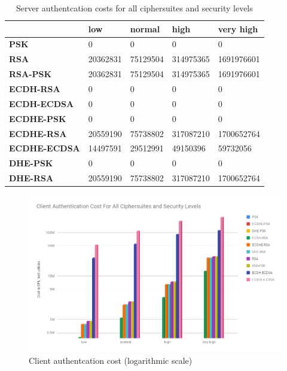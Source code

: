 \documentclass{llncs}
\begin{document}
\begin{table}[]
\begin{tabular}{|l|l|l|l|l|}
\hline
                     & \textbf{low} & \textbf{normal} & \textbf{high} & \textbf{very high} \\ \hline
\textbf{PSK}         & 0            & 0               & 0             & 0                  \\ \hline
\textbf{RSA}         & 20362831     & 75129504        & 314975365     & 1691976601         \\ \hline
\textbf{RSA-PSK}     & 20362831     & 75129504        & 314975365     & 1691976601         \\ \hline
\textbf{ECDH-RSA}    & 0            & 0               & 0             & 0                  \\ \hline
\textbf{ECDH-ECDSA}  & 0            & 0               & 0             & 0                  \\ \hline
\textbf{ECDHE-PSK}   & 0            & 0               & 0             & 0                  \\ \hline
\textbf{ECDHE-RSA}   & 20559190     & 75738802        & 317087210     & 1700652764         \\ \hline
\textbf{ECDHE-ECDSA} & 14497591     & 29512991        & 49150396      & 59732056           \\ \hline
\textbf{DHE-PSK}     & 0            & 0               & 0             & 0                  \\ \hline
\textbf{DHE-RSA}     & 20559190     & 75738802        & 317087210     & 1700652764         \\ \hline
\end{tabular}
  \caption{\label{table:tls-auth-cost-server} Server authentcation costs for all ciphersuites and security levels}
\end{table}

\begin{figure}
  \centering
  \includegraphics[width=1.0\textwidth]{img/tls-client-auth-cost.png}
  \caption{\label{fig:tls-auth-cost-client} Client authentcation cost (logarithmic scale)}
\end{figure}
\end{document}
